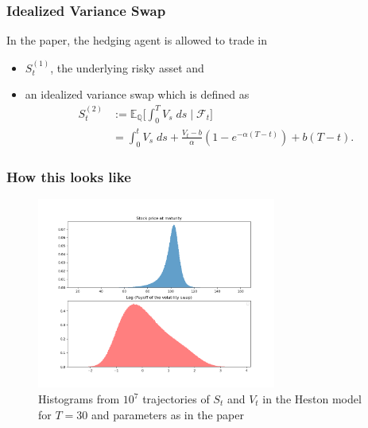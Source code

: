\documentclass[serif]{beamer}
\def\E{{\mathbb E}}
\def\cF{{\mathcal F}}
\begin{document}
\begin{frame}
    \frametitle{Idealized Variance Swap}
    In the paper, the hedging agent is allowed to trade in
    \begin{itemize}
        \item $S^{(1)}_t$, the underlying risky asset and
        \item an idealized variance swap which is defined as
              \begin{align*}
                  S^{(2)}_t & := \E_{\mathbb{Q}} \Big [
                      \int_0^T V_s \; ds \; \Big | \; \cF_t
                  \Big ]                                \\
                            & = \int_0^t V_s \; ds
                  + \frac{V_t - b}{\alpha} (
                  1 - e^{-\alpha(T-t)}
                  ) + b(T-t).
              \end{align*}
    \end{itemize}
\end{frame}

\begin{frame}
    \frametitle{How this looks like}
    \begin{figure}
        \includegraphics[width=0.7\textwidth]{./images/vol_swap_payoff.png}
        \caption{
            Histograms from $10^7$ trajectories of $S_t$ and $V_t$ in the Heston model
            for $T=30$
            and parameters as in the paper
        }
    \end{figure}
\end{frame}
\end{document}
